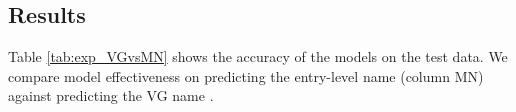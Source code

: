 \subsection{Results}
\label{sect:exp_results}

Table \ref{tab:exp_VGvsMN} shows the accuracy of the models on the \mn test data.
We compare model effectiveness on predicting the entry-level name (column MN) against predicting the VG name . 

